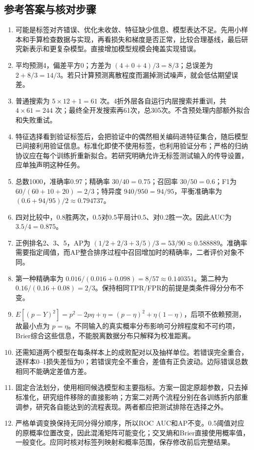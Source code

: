 \documentclass[UTF8,fontset=none,zihao=-4,a4paper]{ctexart}
\numberwithin{equation}{section}
\numberwithin{figure}{section}
\begin{document}
\subsection{参考答案与核对步骤}
\begin{enumerate}[label=14.\arabic*.,before={\interlinepenalty=10000}]
\item 可能是标签对齐错误、优化未收敛、特征缺少信息、模型表达不足。先用小样本和手算检查数据与实现，再看损失和梯度是否正常，比较合理基线，最后研究新表示和更复杂模型。直接增加模型规模会掩盖实现错误。
\item 平均预测4，偏差平方0；方差为 $(4+0+4)/3=8/3$；总误差为 $2+8/3=14/3$。若只计算预测离散程度而漏掉测试噪声，就会低估期望误差。
\item 普通搜索为 $5\times12+1=61$ 次。4折外层各自运行内层搜索并重训，共 $4\times61=244$ 次；最终全开发搜索再61次，总305次。不含预处理内部额外拟合和失败重试。
\item 特征选择看到验证标签后，会把验证中的偶然相关编码进特征集合，随后模型已间接利用验证信息。标准化即使不使用标签，也利用验证分布；严格的归纳协议应在每个训练折重新拟合。若研究明确允许无标签测试输入的传导设置，应单独声明这种任务。
\item 总数1000，准确率0.97；精确率 $30/40=0.75$；召回率 $30/50=0.6$；F1为 $60/(60+10+20)=2/3$；特异度 $940/950=94/95$，平衡准确率为 $(0.6+94/95)/2\approx0.794737$。
\item 四对比较中，0.8胜两次，0.5对0.5平局计0.5、对0.2胜一次。因此AUC为 $3.5/4=0.875$。
\item 正例排名2、3、5，AP为 $(1/2+2/3+3/5)/3=53/90\approx0.588889$。准确率需要指定阈值，而AP整合排序过程中召回增加时的精确率，二者评价对象不同。
\item 第一种精确率为 $0.016/(0.016+0.098)=8/57\approx0.140351$。第二种为 $0.16/(0.16+0.08)=2/3$。保持相同TPR/FPR的前提是类条件得分分布不变。
\item $E[(p-Y)^2]=p^2-2p\eta+\eta=(p-\eta)^2+\eta(1-\eta)$，后项不依赖预测，故最小点为 $p=\eta$。不同输入的真实概率分布影响可分辨程度和不可约项，Brier综合这些信息，不能脱离数据分布只解释为校准距离。
\item 还需知道两个模型在每条样本上的成败配对以及抽样单位。若错误完全重合，逐样本0--1损失差恒为0；若错误完全不重合，差值有正负波动。边际错误总数相同不能确定差值方差。
\item 固定合法划分，使用相同候选模型和主要指标。方案一固定原超参数，只去掉标准化，研究组件移除的直接影响；方案二对两个流程分别在各训练折内部重调参，研究各自能达到的流程表现。两者都应把测试排除在选择之外。
\item 严格单调变换保持无同分得分顺序，所以ROC AUC和AP不变。0.5阈值对应的原概率位置改变，因此混淆矩阵可能变化；交叉熵和Brier直接使用概率值，一般变化。应同时核对标签列映射和概率范围，保存修改前后完整结果。
\end{enumerate}
\end{document}

